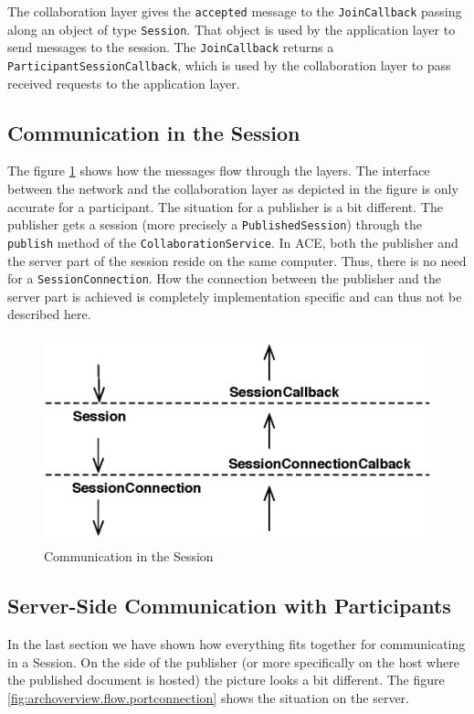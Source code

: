 The collaboration layer gives the \texttt{accepted} message to the
\texttt{JoinCallback} passing along an object of type \texttt{Session}. That
object is used by the application layer to send messages to the session. The
\texttt{JoinCallback} returns a \texttt{ParticipantSessionCallback}, which
is used by the collaboration layer to pass received requests to the 
application layer.


\subsection{Communication in the Session}
The figure \ref{fig:archoverview.flow.session} shows how the messages flow
through the layers. The interface between the network and the collaboration
layer as depicted in the figure is only accurate for a participant. The
situation for a publisher is a bit different. The publisher gets a
session (more precisely a \texttt{PublishedSession}) through the
\texttt{publish} method of the \texttt{CollaborationService}. In ACE, both
the publisher and the server part of the session reside on the same
computer. Thus, there is no need for a \texttt{SessionConnection}. How the
connection between the publisher and the server part is achieved is completely
implementation specific and can thus not be described here.

\begin{figure}[H]
 \centering
 \includegraphics[width=11.78cm,height=6.00cm]{../images/finalreport/architecture_flows/session.eps}
 \caption{Communication in the Session}
 \label{fig:archoverview.flow.session}
\end{figure}


\subsection{Server-Side Communication with Participants}
In the last section we have shown how everything fits together for 
communicating in a Session. On the side of the publisher (or more specifically
on the host where the published document is hosted) the picture looks 
a bit different. The figure \ref{fig:archoverview.flow.portconnection}
shows the situation on the server.

